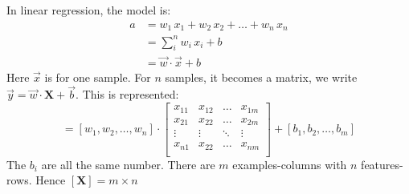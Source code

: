 In linear regression, the model is:
\begin{align*}
 a &= w_1\, x_1 + w_2\, x_2 +\ldots+ w_n\, x_n\\
   &= \sum_i^n w_i\, x_i + b \\
   &= \vec{w}\cdot\vec{x} + b
\end{align*}
Here $\vec{x}$ is for one sample. For $n$ samples, it becomes a matrix, we write $\vec{y} = \vec{w}\cdot\mathbf{X} + \vec{b}$. This is represented:
\begin{equation*}
  [a_1, a_2, \ldots, a_n] = 
  [w_1, w_2, \ldots, w_n] \cdot
  \begin{bmatrix}
    x_{11} & x_{12} & \ldots & x_{1m}\\
    x_{21} & x_{22} & \ldots & x_{2m}\\
    \vdots & \vdots & \ddots & \vdots\\
    x_{n1} & x_{22} & \ldots & x_{nm}\\
  \end{bmatrix}
  + [b_1, b_2, \ldots, b_m]
\end{equation*}
The $b_i$ are all the same number. There are $m$ examples-columns with $n$ features-rows. Hence $[\mathbf{X}] = m\times{}n$


